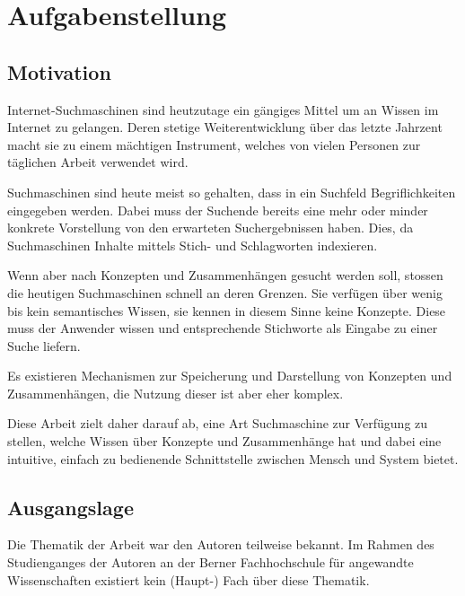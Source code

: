\chapter{Aufgabenstellung}
\label{chap:Aufgabenstellung}


\section{Motivation}
\label{sec:aufgabe_motivation}
Internet-Suchmaschinen sind heutzutage ein gängiges Mittel um an Wissen im Internet zu gelangen. Deren stetige Weiterentwicklung über das letzte Jahrzent macht sie zu einem mächtigen Instrument, welches von vielen Personen zur täglichen Arbeit verwendet wird.

Suchmaschinen sind heute meist so gehalten, dass in ein Suchfeld Begriflichkeiten eingegeben werden. Dabei muss der Suchende bereits eine mehr oder minder konkrete Vorstellung von den erwarteten Suchergebnissen haben. Dies, da Suchmaschinen Inhalte mittels Stich- und Schlagworten indexieren.

Wenn aber nach Konzepten und Zusammenhängen gesucht werden soll, stossen die heutigen Suchmaschinen schnell an deren Grenzen.  Sie verfügen über wenig bis kein semantisches Wissen, sie kennen in diesem Sinne keine Konzepte. Diese muss der Anwender wissen und entsprechende Stichworte als Eingabe zu einer Suche liefern.

Es existieren Mechanismen zur Speicherung und Darstellung von Konzepten und Zusammenhängen, die Nutzung dieser ist aber eher komplex.

Diese Arbeit zielt daher darauf ab, eine Art Suchmaschine zur Verfügung zu stellen, welche Wissen über Konzepte und Zusammenhänge hat und dabei eine intuitive, einfach zu bedienende Schnittstelle zwischen Mensch und System bietet.

\section{Ausgangslage}
\label{sec:aufgabe_ausgangslage}
Die Thematik der Arbeit war den Autoren teilweise bekannt. Im Rahmen des Studienganges der Autoren an der Berner Fachhochschule für angewandte Wissenschaften existiert kein (Haupt-) Fach über diese Thematik.

